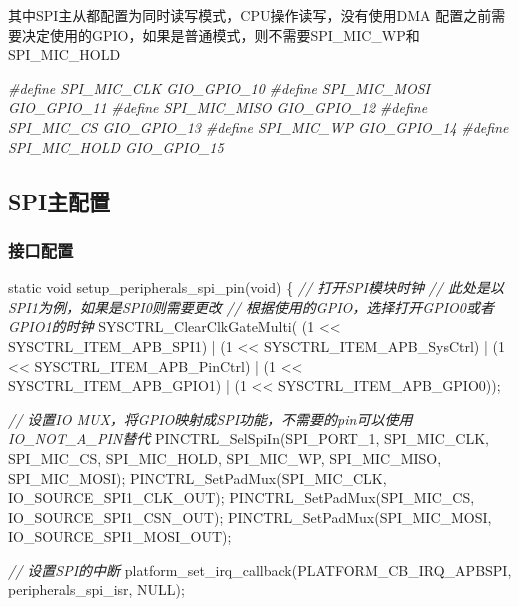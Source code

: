 \documentclass[
  12pt,
]{book}
\newenvironment{Shaded}{\begin{snugshade}}{\end{snugshade}}
\newcommand{\CommentTok}[1]{\textcolor[rgb]{0.56,0.35,0.01}{\textit{#1}}}
\newcommand{\DataTypeTok}[1]{\textcolor[rgb]{0.13,0.29,0.53}{#1}}
\newcommand{\DecValTok}[1]{\textcolor[rgb]{0.00,0.00,0.81}{#1}}
\newcommand{\NormalTok}[1]{#1}
\newcommand{\PreprocessorTok}[1]{\textcolor[rgb]{0.56,0.35,0.01}{\textit{#1}}}
\begin{document}
其中SPI主从都配置为同时读写模式，CPU操作读写，没有使用DMA 配置之前需要决定使用的GPIO，如果是普通模式，则不需要SPI\_MIC\_WP和SPI\_MIC\_HOLD

\begin{Shaded}
\begin{Highlighting}[]
\PreprocessorTok{#define SPI_MIC_CLK         GIO_GPIO_10}
\PreprocessorTok{#define SPI_MIC_MOSI        GIO_GPIO_11}
\PreprocessorTok{#define SPI_MIC_MISO        GIO_GPIO_12}
\PreprocessorTok{#define SPI_MIC_CS          GIO_GPIO_13}
\PreprocessorTok{#define SPI_MIC_WP          GIO_GPIO_14}
\PreprocessorTok{#define SPI_MIC_HOLD        GIO_GPIO_15}
\end{Highlighting}
\end{Shaded}

\hypertarget{spiux4e3bux914dux7f6e-2}{%
\subsection{SPI主配置}\label{spiux4e3bux914dux7f6e-2}}

\hypertarget{ux63a5ux53e3ux914dux7f6e-4}{%
\subsubsection{接口配置}\label{ux63a5ux53e3ux914dux7f6e-4}}

\begin{Shaded}
\begin{Highlighting}[]
\DataTypeTok{static} \DataTypeTok{void}\NormalTok{ setup_peripherals_spi_pin(}\DataTypeTok{void}\NormalTok{)}
\NormalTok{\{}
    \CommentTok{// 打开SPI模块时钟}
    \CommentTok{// 此处是以SPI1为例，如果是SPI0则需要更改}
    \CommentTok{// 根据使用的GPIO，选择打开GPIO0或者GPIO1的时钟}
\NormalTok{    SYSCTRL_ClearClkGateMulti(    (}\DecValTok{1}\NormalTok{ << SYSCTRL_ITEM_APB_SPI1)}
\NormalTok{                                | (}\DecValTok{1}\NormalTok{ << SYSCTRL_ITEM_APB_SysCtrl)}
\NormalTok{                                | (}\DecValTok{1}\NormalTok{ << SYSCTRL_ITEM_APB_PinCtrl)}
\NormalTok{                                | (}\DecValTok{1}\NormalTok{ << SYSCTRL_ITEM_APB_GPIO1)}
\NormalTok{                                | (}\DecValTok{1}\NormalTok{ << SYSCTRL_ITEM_APB_GPIO0));}

    \CommentTok{// 设置IO MUX，将GPIO映射成SPI功能，不需要的pin可以使用IO_NOT_A_PIN替代}
\NormalTok{    PINCTRL_SelSpiIn(SPI_PORT_1, SPI_MIC_CLK, SPI_MIC_CS, SPI_MIC_HOLD, SPI_MIC_WP, SPI_MIC_MISO, SPI_MIC_MOSI);}
\NormalTok{    PINCTRL_SetPadMux(SPI_MIC_CLK, IO_SOURCE_SPI1_CLK_OUT);}
\NormalTok{    PINCTRL_SetPadMux(SPI_MIC_CS, IO_SOURCE_SPI1_CSN_OUT);}
\NormalTok{    PINCTRL_SetPadMux(SPI_MIC_MOSI, IO_SOURCE_SPI1_MOSI_OUT);}
    
    \CommentTok{// 设置SPI的中断}
\NormalTok{    platform_set_irq_callback(PLATFORM_CB_IRQ_APBSPI, peripherals_spi_isr, NULL);}
\end{Highlighting}
\end{Shaded}
\end{document}
